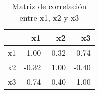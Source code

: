 \begin{table}[ht]
\centering
\begin{tabular}{rrrr}
  \hline
 & x1 & x2 & x3 \\ 
  \hline
x1 & 1.00 & -0.32 & -0.74 \\ 
  x2 & -0.32 & 1.00 & -0.40 \\ 
  x3 & -0.74 & -0.40 & 1.00 \\ 
   \hline
\end{tabular}
\caption{Matriz de correlación entre x1, x2 y x3} 
\end{table}
